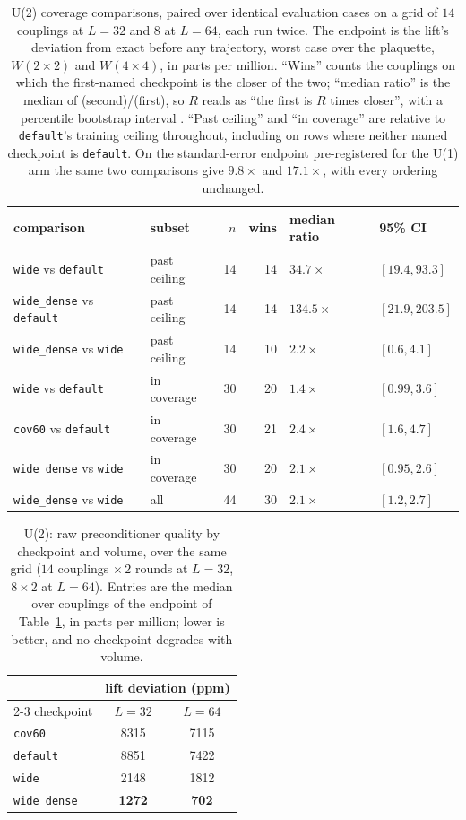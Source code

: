 \documentclass[prd, twocolumn, superscriptaddress, nofootinbib,floatfix]{revtex4-2}
\DeclareRobustCommand{\tb}[1]{Table~\ref{tab:#1}}
\begin{document}
\begin{table}[htbp]
\centering
\small
\caption{U(2) coverage comparisons, paired over identical evaluation cases on a
grid of $14$ couplings at $L=32$ and $8$ at $L=64$, each run twice. The endpoint
is the lift's deviation from exact before any trajectory, worst case over
the plaquette, $W(2\times2)$ and $W(4\times4)$, in parts per million. ``Wins'' counts the couplings on which the first-named checkpoint is the closer
of the two; ``median ratio'' is the median of (second)/(first), so $R$ reads as
``the first is $R$ times closer'', with a percentile bootstrap interval
\cite{efron1993}. ``Past ceiling'' and ``in coverage'' are relative to
\texttt{default}'s training ceiling throughout, including on rows where neither
named checkpoint is \texttt{default}. On the standard-error endpoint pre-registered for the U(1)
arm the same two comparisons give $9.8\times$ and $17.1\times$, with every
ordering unchanged.}
\label{tab:u2_coverage_tests}
\begin{tabular}{llrrll}
\toprule
comparison & subset & $n$ & wins & median ratio & 95\% CI \\
\midrule
\texttt{wide} vs \texttt{default} & past ceiling & 14 & 14 & $34.7\times$ & $[19.4,93.3]$ \\
\texttt{wide\_dense} vs \texttt{default} & past ceiling & 14 & 14 & $134.5\times$ & $[21.9,203.5]$ \\
\texttt{wide\_dense} vs \texttt{wide} & past ceiling & 14 & 10 & $2.2\times$ & $[0.6,4.1]$ \\
\addlinespace
\texttt{wide} vs \texttt{default} & in coverage & 30 & 20 & $1.4\times$ & $[0.99,3.6]$ \\
\texttt{cov60} vs \texttt{default} & in coverage & 30 & 21 & $2.4\times$ & $[1.6,4.7]$ \\
\texttt{wide\_dense} vs \texttt{wide} & in coverage & 30 & 20 & $2.1\times$ & $[0.95,2.6]$ \\
\texttt{wide\_dense} vs \texttt{wide} & all & 44 & 30 & $2.1\times$ & $[1.2,2.7]$ \\
\bottomrule
\end{tabular}
\end{table}

\begin{table}[htbp]
\centering
\small
\caption{U(2): raw preconditioner quality by checkpoint and volume, over the
same grid ($14$ couplings $\times\,2$ rounds at $L=32$, $8\times2$ at $L=64$).
Entries are the median over couplings of the endpoint of
\tb{u2_coverage_tests}, in parts per million; lower is better, and no
checkpoint degrades with volume.}
\label{tab:volume_scaling}
\begin{tabular}{lcc}
\toprule
 & \multicolumn{2}{c}{lift deviation (ppm)} \\
\cmidrule(lr){2-3}
checkpoint & $L=32$ & $L=64$ \\
\midrule
\texttt{cov60}   & 8315 & 7115 \\
\texttt{default} & 8851 & 7422 \\
\texttt{wide}    & 2148 & 1812 \\
\texttt{wide\_dense} & \textbf{1272} & \textbf{702} \\
\bottomrule
\end{tabular}
\end{table}
\end{document}
